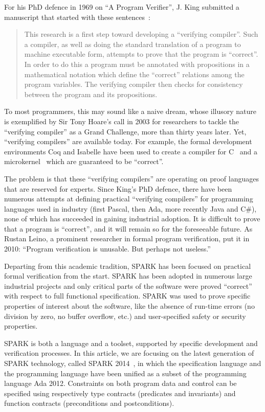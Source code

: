 \documentclass{llncs}
\begin{document}
For his PhD defence in 1969 on ``A Program Verifier'', J. King submitted a
manuscript that started with these sentences~\cite{King1970PhD}:

\begin{quote}
This research is a first step toward developing a ``verifying compiler''. Such
a compiler, as well as doing the standard translation of a program to machine
executable form, attempts to prove that the program is ``correct''. In order to
do this a program must be annotated with propositions in a mathematical
notation which define the ``correct'' relations among the program
variables. The verifying compiler then checks for consistency between the
program and its propositions.
\end{quote}

To most programmers, this may sound like a naive dream, whose illusory nature
is exemplified by Sir Tony Hoare’s call in 2003 for researchers to tackle the
``verifying compiler'' as a Grand Challenge, more than thirty years later. Yet,
``verifying compilers'' are available today. For example, the formal
development environments Coq and Isabelle have been used to create a compiler
for C~\cite{Leroy-backend} and a microkernel~\cite{Klein2009SOSP} which are
guaranteed to be ``correct''.

The problem is that these ``verifying compilers'' are operating on proof
languages that are reserved for experts. Since King's PhD defence, there have
been numerous attempts at defining practical ``verifying compilers'' for
programming languages used in industry (first Pascal, then Ada, more recently
Java and C\#), none of which has succeeded in gaining industrial adoption. It is
difficult to prove that a program is ``correct'', and it will remain so for the
foreseeable future. As Rustan Leino, a prominent researcher in formal program
verification, put it in 2010: ``Program verification is unusable. But perhaps
not useless.''~\cite{Leino10usableauto-active}

Departing from this academic tradition, SPARK has been focused on practical
formal verification from the start. SPARK has been adopted in numerous large
industrial projects and only critical parts of the software were proved
``correct'' with respect to full functional specification. SPARK was used to
prove specific properties of interest about the software, like the absence of
run-time errors (no division by zero, no buffer overflow, etc.) and
user-specified safety or security properties.

SPARK is both a language and a toolset, supported by specific development and
verification processes. In this article, we are focusing on the latest
generation of SPARK technology, called SPARK 2014~\cite{sparkERTS2014}, in
which the specification language and the programming language have been unified
as a subset of the programming language Ada 2012. Constraints on both program
data and control can be specified using respectively type contracts (predicates
and invariants) and function contracts (preconditions and
postconditions).
\end{document}
